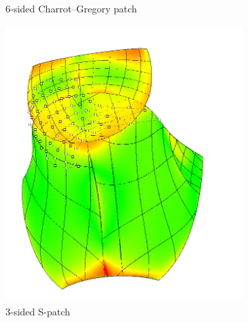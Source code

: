 \documentclass[9pt,academicons]{article}
\begin{document}
\begin{figure}
{\begin{subfigure}{.3\textwidth}
      \caption{6-sided Charrot--Gregory patch}
      \label{fig:cagd86-6-cg}
    \end{subfigure}
    \hfill
  }

  {
    \hfill
    \begin{subfigure}{.3\textwidth}
      \centering
      \includegraphics[width=\textwidth]{images/cagd86/spatch3.png}
      \caption{3-sided S-patch}
      \label{fig:cagd86-3-sp}
    \end{subfigure}
    \hfill
    \begin{subfigure}{.3\textwidth}
      \centering

\end{subfigure}}
\end{figure}
\end{document}
